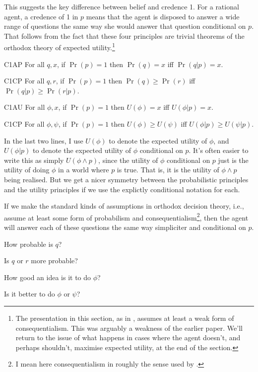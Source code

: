 This suggests the key difference between belief and credence 1. For a rational agent, a credence of 1 in $p$ means that the agent is disposed to answer a wide range of questions the same way she would answer that question conditional on \(p\). That follows from the fact that these four principles are trivial theorems of the orthodox theory of expected utility.\footnote{The presentation in this section, as in \cite{Weatherson2005-WEACWD}, assumes at least a weak form of consequentialism. This was arguably a weakness of the earlier paper. We'll return to the issue of what happens in cases where the agent doesn't, and perhaps shouldn't, maximise expected utility, at the end of the section.} 

\begin{description*}
\item[C1AP] For all \(q, x\), if \(\Pr(p) = 1\) then \(\Pr(q) = x\) iff \(\Pr(q | p) = x\).
\item[C1CP] For all \(q, r\), if \(\Pr(p) = 1\) then \(\Pr(q) \geq \Pr(r)\) iff \(\Pr(q | p) \geq \Pr(r | p)\).
\item[C1AU] For all \(\phi, x\), if \(\Pr(p) = 1\) then \(U(\phi) = x\) iff \(U(\phi | p) = x\).
\item[C1CP] For all \(\phi, \psi\), if \(\Pr(p) = 1\) then \(U(\phi) \geq U(\psi)\) iff \(U(\phi | p) \geq U(\psi | p)\).
\end{description*}

\noindent In the last two lines, I use \(U(\phi)\) to denote the expected utility of \(\phi\), and \(U(\phi | p)\) to denote the expected utility of \(\phi\) conditional on \(p\). It's often easier to write this as simply \(U(\phi \wedge p)\), since the utility of \(\phi\) conditional on \(p\) just is the utility of doing \(\phi\) in a world where \(p\) is true. That is, it is the utility of \(\phi \wedge p\) being realised. But we get a nicer symmetry between the probabilistic principles and the utility principles if we use the explictly conditional notation for each.

If we make the standard kinds of assumptions in orthodox decision theory, i.e., assume at least some form of probabilism and consequentialism\footnote{I mean here consequentialism in roughly the sense used by \cite{Hammond1988}.}, then the agent will answer each of these questions the same way simpliciter and conditional on \(p\).

\begin{itemize*}
\item How probable is \(q\)?
\item Is \(q\) or \(r\) more probable?
\item How good an idea is it to do \(\phi\)?
\item Is it better to do \(\phi\) or \(\psi\)?
\end{itemize*}


